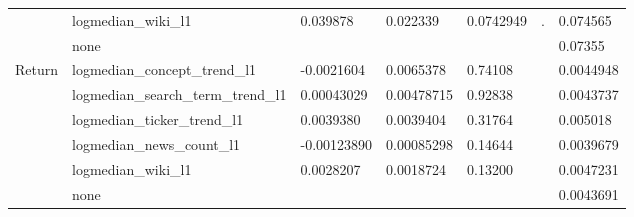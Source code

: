\begin{table}[!htbp]
\begin{tabular}{lllllll}
                            & logmedian\_wiki\_l1                & 0.039878             & 0.022339           & 0.0742949        & .                     & 0.074565                      \\
                            & none                               &                      &                    &                  &                       & 0.07355                       \\
\multirow{6}{*}{Return}     & logmedian\_concept\_trend\_l1      & -0.0021604           & 0.0065378          & 0.74108          &                       & 0.0044948                     \\
                            & logmedian\_search\_term\_trend\_l1 & 0.00043029           & 0.00478715         & 0.92838          &                       & 0.0043737                     \\
                            & logmedian\_ticker\_trend\_l1       & 0.0039380            & 0.0039404          & 0.31764          &                       & 0.005018                      \\
                            & logmedian\_news\_count\_l1         & -0.00123890          & 0.00085298         & 0.14644          &                       & 0.0039679                     \\
                            & logmedian\_wiki\_l1                & 0.0028207            & 0.0018724          & 0.13200          &                       & 0.0047231                     \\
                            & none                               &                      &                    &                  &                       & 0.0043691                    
\end{tabular}
\end{table}


